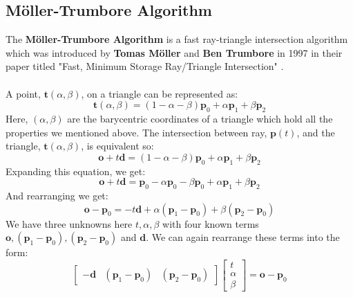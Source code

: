\documentclass[11pt,a4paper]{article}
\begin{document}
	\subsection{Möller-Trumbore Algorithm}
	The \textbf{Möller-Trumbore Algorithm} is a fast ray-triangle intersection algorithm which was introduced by \textbf{Tomas Möller} and \textbf{Ben Trumbore} in 1997 in their paper titled "Fast, Minimum Storage Ray/Triangle Intersection" \cite{moller1997fast}.\\~\\
	\noindent
	A point, $\boldsymbol{t}(\alpha, \beta)$, on a triangle can be represented as:
	\begin{equation}
		\boldsymbol{t}(\alpha, \beta) = (1 - \alpha - \beta)\boldsymbol{p}_{0} + \alpha\boldsymbol{p}_{1} + \beta\boldsymbol{p}_{2}
	\end{equation}
	\noindent
	Here, $(\alpha, \beta)$ are the barycentric coordinates of a triangle which hold all the properties we mentioned above. The intersection between ray, $\boldsymbol{p}(t)$, and the triangle, $\boldsymbol{t}(\alpha, \beta)$, is equivalent so:
	\begin{equation}
		\boldsymbol{o} + t\boldsymbol{d} = (1 - \alpha - \beta)\boldsymbol{p}_{0} + \alpha\boldsymbol{p}_{1} + \beta\boldsymbol{p}_{2}
	\end{equation}
	Expanding this equation, we get:
	\begin{equation}
		\boldsymbol{o} + t\boldsymbol{d} = \boldsymbol{p}_{0} - \alpha\boldsymbol{p}_{0} - \beta\boldsymbol{p}_{0} + \alpha\boldsymbol{p}_{1} + \beta\boldsymbol{p}_{2}
	\end{equation}
	And rearranging we get:
	\begin{equation}
		\boldsymbol{o} - \boldsymbol{p}_{0} = -t\boldsymbol{d} + \alpha(\boldsymbol{p}_{1} - \boldsymbol{p}_{0}) + \beta(\boldsymbol{p}_{2} - \boldsymbol{p}_{0})
	\end{equation}
	\noindent
	We have three unknowns here $t, \alpha, \beta$ with four known terms $\boldsymbol{o}, (\boldsymbol{p}_{1} - \boldsymbol{p}_{0}), (\boldsymbol{p}_{2} - \boldsymbol{p}_{0})$ and $\boldsymbol{d}$. We can again rearrange these terms into the form:
	\[
	\left[
	\begin{array}{ccc}
		-\boldsymbol{d} & (\boldsymbol{p}_{1} - \boldsymbol{p}_{0}) & (\boldsymbol{p}_{2} - \boldsymbol{p}_{0}) 
	\end{array}
	\right]
	\begin{bmatrix}
		t \\
		\alpha \\
		\beta 
	\end{bmatrix} = \boldsymbol{o} - \boldsymbol{p}_{0}
	\]
\end{document}
